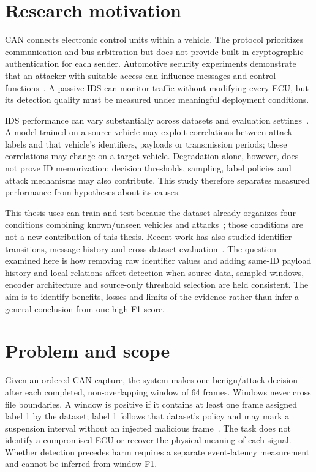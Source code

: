 \documentclass[12pt,a4paper,oneside,openany]{extbook}
\begin{document}
\section{Research motivation}
CAN connects electronic control units within a vehicle. The protocol prioritizes communication and bus arbitration but does not provide built-in cryptographic authentication for each sender. Automotive security experiments demonstrate that an attacker with suitable access can influence messages and control functions~\cite{koscher2010experimental,checkoway2011comprehensive}. A passive IDS can monitor traffic without modifying every ECU, but its detection quality must be measured under meaningful deployment conditions.

IDS performance can vary substantially across datasets and evaluation settings~\cite{koltai2026trust}. A model trained on a source vehicle may exploit correlations between attack labels and that vehicle's identifiers, payloads or transmission periods; these correlations may change on a target vehicle. Degradation alone, however, does not prove ID memorization: decision thresholds, sampling, label policies and attack mechanisms may also contribute. This study therefore separates measured performance from hypotheses about its causes.

This thesis uses can-train-and-test because the dataset already organizes four conditions combining known/unseen vehicles and attacks~\cite{lampe2024curated}; those conditions are not a new contribution of this thesis. Recent work has also studied identifier transitions, message history and cross-dataset evaluation~\cite{khreasat2026relational,dong2026mtff,koltai2026trust}. The question examined here is how removing raw identifier values and adding same-ID payload history and local relations affect detection when source data, sampled windows, encoder architecture and source-only threshold selection are held consistent. The aim is to identify benefits, losses and limits of the evidence rather than infer a general conclusion from one high F1 score.

\section{Problem and scope}
Given an ordered CAN capture, the system makes one benign/attack decision after each completed, non-overlapping window of 64 frames. Windows never cross file boundaries. A window is positive if it contains at least one frame assigned label 1 by the dataset; label 1 follows that dataset's policy and may mark a suspension interval without an injected malicious frame~\cite{rajapaksha2024canmirgu}. The task does not identify a compromised ECU or recover the physical meaning of each signal. Whether detection precedes harm requires a separate event-latency measurement and cannot be inferred from window F1.
\end{document}
